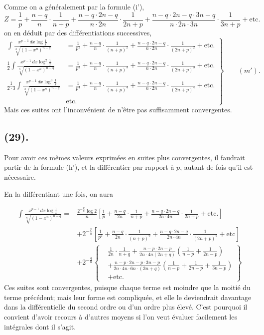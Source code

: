 \documentclass{article}
\begin{document}
Comme on a généralement par la formule (i'),
\[ Z=\frac{1}{p}+\frac{n-q}{n}\cdot\frac{1}{n+p}+\frac{n-q\cdot 2n-q}{n\cdot 2n}\cdot\frac{1}{2n+p}+\frac{n-q\cdot 2n-q\cdot 3n-q}{n\cdot 2n\cdot 3n}\cdot\frac{1}{3n+p}+\text{etc.} \]
on en déduit par des différentiations successives,
\[ \left.\begin{aligned} \int\frac{x^{p-1}\,dx\log\frac{1}{x}}{\sqrt[n]{(1-x^{n})^{n-q}}}&=\frac{1}{p^{2}}+\frac{n-q}{n}\cdot\frac{1}{(n+p)^{2}}+\frac{n-q\cdot 2n-q}{n\cdot 2n}\cdot\frac{1}{(2n+p)^{2}}+\text{etc.}\\ \frac{1}{2}\int\frac{x^{p-1}\,dx\log^{2}\frac{1}{x}}{\sqrt[n]{(1-x^{n})^{n-q}}}&=\frac{1}{p^{3}}+\frac{n-q}{n}\cdot\frac{1}{(n+p)^{3}}+\frac{n-q\cdot 2n-q}{n\cdot 2n}\cdot\frac{1}{(2n+p)^{3}}+\text{etc.}\\ \frac{1}{2\cdot 3}\int\frac{x^{p-1}\,dx\log^{3}\frac{1}{x}}{\sqrt[n]{(1-x^{n})^{n-q}}}&=\frac{1}{p^{4}}+\frac{n-q}{n}\cdot\frac{1}{(n+p)^{4}}+\frac{n-q\cdot 2n-q}{n\cdot 2n}\cdot\frac{1}{(2n+p)^{4}}+\text{etc.}\\ &\text{etc.} \end{aligned}\right\}\qquad(m'). \]
Mais ces suites ont l'inconvénient de n'être pas suffisamment convergentes.

\subsection*{(29).}

Pour avoir ces mêmes valeurs exprimées en suites plus convergentes, il faudrait partir de la formule (h'), et la différentier par rapport à $p$, autant de fois qu'il est nécessaire.

En la différentiant une fois, on aura

\[ \begin{aligned} \int\frac{x^{p-1}\,dx\log\frac{1}{x}}{\sqrt[n]{(1-x^{n})^{n-q}}}={}&\frac{2^{-\frac{p}{n}}\log 2}{n}\left[\frac{1}{p}+\frac{n-q}{2n}\cdot\frac{1}{n+p}+\frac{n-q\cdot 2n-q}{2n\cdot 4n}\cdot\frac{1}{2n+p}+\text{etc.}\right]\\ &+2^{-\frac{p}{n}}\left[\frac{1}{p^{2}}+\frac{n-q}{2n}\cdot\frac{1}{(n+p)^{2}}+\frac{n-q\cdot 2n-q}{2n\cdot 4n}\cdot\frac{1}{(2n+p)^{2}}+\text{etc}\right]\\ &+2^{-\frac{q}{n}}\left\{\begin{aligned} &\frac{1}{2n}\cdot\frac{1}{n+q}+\frac{n-p\cdot 2n-p}{2n\cdot 4n(2n+q)}\left(\frac{1}{n-p}+\frac{1}{2n-p}\right)\\ &+\frac{n-p\cdot 2n-p\cdot 3n-p}{2n\cdot 4n\cdot 6n\cdot(3n+q)}\left(\frac{1}{n-p}+\frac{1}{2n-p}+\frac{1}{3n-p}\right)\\ &+\text{etc.} \end{aligned}\right\} \end{aligned} \]
Ces suites sont convergentes, puisque chaque terme est moindre que la moitié du terme précédent; mais leur forme est compliquée, et elle le deviendrait davantage dans la différentielle du second ordre ou d'un ordre plus élevé. C'est pourquoi il convient d'avoir recours à d'autres moyens si l'on veut évaluer facilement les intégrales dont il s'agit.
\end{document}
